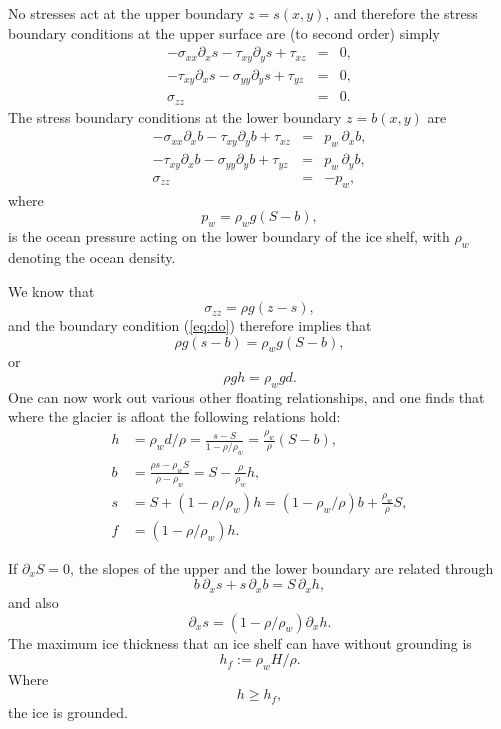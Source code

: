 \documentclass[10pt,a4paper]{book}
\newcommand{\p}{\partial}
\newcommand{\txy}{\tau_{xy}}
\newcommand{\txz}{\tau_{xz}}
\newcommand{\tyz}{\tau_{yz}}
\newcommand{\sxx}{\sigma_{xx}}
\newcommand{\syy}{\sigma_{yy}}
\newcommand{\szz}{\sigma_{zz}}
\begin{document}
No stresses act at the upper boundary $z=s(x,y)$, and therefore the stress
boundary conditions at the upper surface are (to second order) simply
\begin{eqnarray}
-\sxx \p_x s -\txy \p_y s + \txz&=& 0 ,\\ 
-\txy \p_x s -\syy \p_y s + \tyz&=& 0 , \\
                            \szz&=& 0. \label{eq:up}
\end{eqnarray}
The stress boundary conditions at the lower boundary
$z=b(x,y)$ are
\begin{eqnarray}
-\sxx \p_x b -\txy \p_y b + \txz&=&p_w \,\p_x b ,\\
-\txy \p_x b -\syy \p_y b + \tyz&=&p_w \,\p_y b ,\\
                            \szz&=&-p_w  , \label{eq:do}
\end{eqnarray}
where
\[
p_w= \rho_w g (S-b) ,
\]
is the ocean pressure acting on the lower boundary of the ice shelf,
with $\rho_w$ denoting the ocean density.


We know that  
\begin{equation}
\szz=\rho g (z-s) , \label{eq:szzshelf}
\end{equation}
and the boundary condition (\ref{eq:do}) therefore implies that
\[
 \rho g (s-b)=  \rho_{w} g  (S-b),
\]
or
\[
 \rho g h= \rho_{w} g d.
\]
One can now work out various other floating relationships, and one finds that
where the glacier is afloat the following relations hold:
\begin{align} 
h &= \rho_w d /\rho =\frac{s-S}{1-\rho/\rho_w} = \frac{\rho_w}{\rho} (S-b) ,\label{eq:hs1} \\
b &= \frac{\rho s - \rho_w S}{\rho-\rho_w}  = S-\frac{\rho}{\rho_w} h , \label{eq:bh1}\\
s &= S+(1-\rho/\rho_w) h = (1-\rho_w/\rho) b +\frac{\rho_w}{\rho} S, \label{eq:sb2}\\
f&= (1-\rho/\rho_w) h  . 
\end{align}

If $\p_x S=0$, the slopes of the upper and the lower boundary are related through
\begin{equation}
b \, \p_x s +  s \, \p_x b = S \, \p_x h,
\label{eq:resi}
\end{equation}
and also
\begin{equation}
\p_x s=(1-\rho/\rho_w) \p_x h .
\label{eq:fl}
\end{equation}
The maximum ice thickness that an ice shelf can have without grounding is
\[
h_f := \rho_w H /\rho. 
\]
Where
\[  h  \ge h_f , \]
the ice is grounded.
\end{document}
